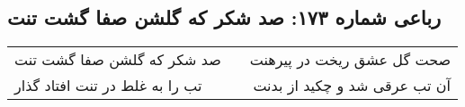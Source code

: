 \begin{center}
\section*{رباعی شماره ۱۷۳: صد شکر که گلشن صفا گشت تنت}
\label{sec:sh173}
\begin{longtable}{l p{0.5cm} r}
صد شکر که گلشن صفا گشت تنت
&&
صحت گل عشق ریخت در پیرهنت
\\
تب را به غلط در تنت افتاد گذار
&&
آن تب عرقی شد و چکید از بدنت
\\
\end{longtable}
\end{center}
